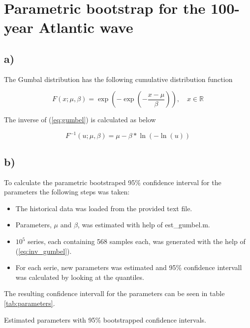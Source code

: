 \documentclass[a4paper]{article}
\begin{document}
\newpage

\section{Parametric bootstrap for the 100-year Atlantic wave}

\subsection*{a)}

The Gumbal distribution has the following cumulative distribution function

\begin{equation}
    F(x; \mu, \beta) = \exp\left(-\exp\left(-\frac{x-\mu}{\beta}\right)\right), \quad x \in \mathbb{R}
    \label{eq:gumbel}
\end{equation}

The inverse of (\ref{eq:gumbel}) is calculated as below

\begin{equation}
    F^{-1}(u; \mu, \beta) = \mu - \beta*\ln(-\ln(u))
    \label{eq:inv_gumbel}
\end{equation}

\subsection*{b)}

To calculate the parametric bootstraped 95\% confidence interval for the parameters the following steps was taken:

\begin{itemize}
    \item The historical data was loaded from the provided text file.
    \item Parameters, $\mu$ and $\beta$, was estimated with help of est\_gumbel.m.
    \item $10^5$ series, each containing 568 samples each, was generated with the help of (\ref{eq:inv_gumbel}).
    \item For each serie, new parameters was estimated and 95\% confidence intervall was calculated by looking at the quantiles.
\end{itemize}

The resulting confidence intervall for the parameters can be seen in table \ref{tab:parameters}.

\begin{table}[H]
    \centering
    \caption{Estimated parameters with 95\% bootstrapped confidence intervals.}
    \label{tab:parameters}
    
\end{table}
\end{document}

